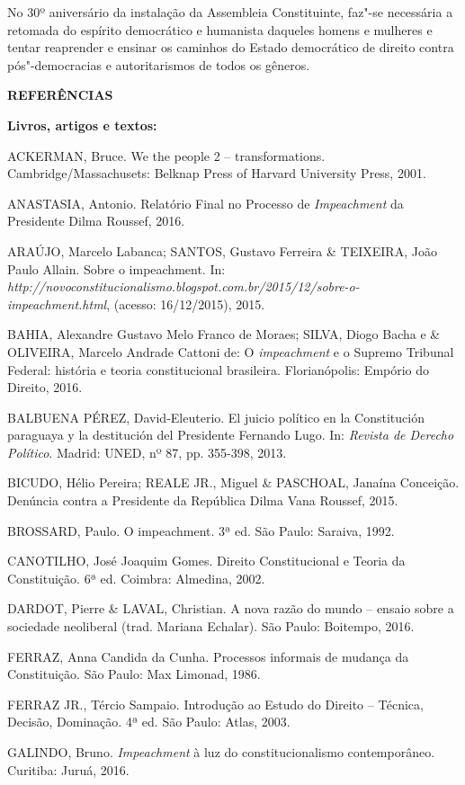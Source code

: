 No 30º aniversário da instalação da Assembleia Constituinte, faz"-se
necessária a retomada do espírito democrático e humanista daqueles
homens e mulheres e tentar reaprender e ensinar os caminhos do Estado
democrático de direito contra pós"-democracias e autoritarismos de todos
os gêneros.

\textbf{REFERÊNCIAS}

\textbf{Livros, artigos e textos:}

ACKERMAN, Bruce. We the people 2 -- transformations.
Cambridge/Massachusets: Belknap Press of Harvard University Press, 2001.

ANASTASIA, Antonio. Relatório Final no Processo de \emph{Impeachment} da
Presidente Dilma Roussef, 2016.

ARAÚJO, Marcelo Labanca; SANTOS, Gustavo Ferreira \& TEIXEIRA, João
Paulo Allain. Sobre o impeachment. In:
\emph{http://novoconstitucionalismo.blogspot.com.br/2015/12/sobre-o-impeachment.html},
(acesso: 16/12/2015), 2015.

BAHIA, Alexandre Gustavo Melo Franco de Moraes; SILVA, Diogo Bacha e \&
OLIVEIRA, Marcelo Andrade Cattoni de: O \emph{impeachment} e o Supremo
Tribunal Federal: história e teoria constitucional brasileira.
Florianópolis: Empório do Direito, 2016.

BALBUENA PÉREZ, David-Eleuterio. El juicio político en la Constitución
paraguaya y la destitución del Presidente Fernando Lugo. In:
\emph{Revista de Derecho Político}. Madrid: UNED, nº 87, pp. 355-398,
2013.

BICUDO, Hélio Pereira; REALE JR., Miguel \& PASCHOAL, Janaína Conceição.
Denúncia contra a Presidente da República Dilma Vana Roussef, 2015.

BROSSARD, Paulo. O impeachment. 3ª ed. São Paulo: Saraiva, 1992.

CANOTILHO, José Joaquim Gomes. Direito Constitucional e Teoria da
Constituição. 6ª ed. Coimbra: Almedina, 2002.

DARDOT, Pierre \& LAVAL, Christian. A nova razão do mundo -- ensaio
sobre a sociedade neoliberal (trad. Mariana Echalar). São Paulo:
Boitempo, 2016.

FERRAZ, Anna Candida da Cunha. Processos informais de mudança da
Constituição. São Paulo: Max Limonad, 1986.

FERRAZ JR., Tércio Sampaio. Introdução ao Estudo do Direito -- Técnica,
Decisão, Dominação. 4ª ed. São Paulo: Atlas, 2003.

GALINDO, Bruno. \emph{Impeachment} à luz do constitucionalismo
contemporâneo. Curitiba: Juruá, 2016.

